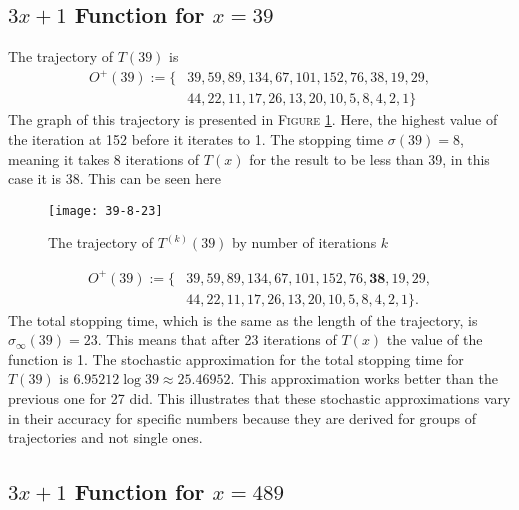 \documentclass[12pt,a4paper,reqno]{amsart}
\begin{document}
\subsection{$3x+1$ Function for $x=39$}

The trajectory of $T(39)$ is 
\begin{align}
    \nonumber
    O^+(39):=\{&39,59,89,134,67,101,152,76,38,19,29,\\
    \nonumber
               &44,22,11,17,26,13,20,10,5,8,4,2,1\}
\end{align}
The graph of this trajectory is presented in \textsc{Figure}
\ref{fig:02}. Here, the highest value of the iteration at 152 before it iterates to 
1. The stopping time $\sigma(39)=8$, meaning it takes 8 iterations of $T(x)$
for the result to be less than 39, in this case it is 38. This can be seen here
\begin{figure}[h]
\texttt{[image: 39-8-23]}
    \caption{The trajectory of $T^{(k)}(39)$ by number of iterations $k$}
\label{fig:02}
\end{figure}
\begin{align}
    \nonumber
    O^+(39):=\{&39,59,89,134,67,101,152,76,\textbf{38},19,29,\\
    \nonumber
               &44,22,11,17,26,13,20,10,5,8,4,2,1\}.
\end{align}
The total stopping time, which is the same as the length of the trajectory, is
$\sigma_{\infty}(39)=23$. This means that after 23 iterations of $T(x)$ the value
of the function is 1. The stochastic approximation for the total 
stopping time for $T(39)$ is $6.95212 \log 39 \approx 25.46952$. This 
approximation works better than the previous one for 27 did. This illustrates
that these stochastic approximations vary in their accuracy for specific
numbers because they are derived for groups of trajectories and not single
ones.

\subsection{$3x+1$ Function for $x=489$}
\end{document}
